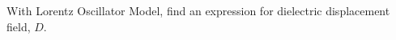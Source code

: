 
\begin{comment}
  Put all the topics for this question.
\end{comment}
		
\question [12] With Lorentz Oscillator Model, find an expression for dielectric displacement field, $D$. 

\begin{solution}

\end{solution}

